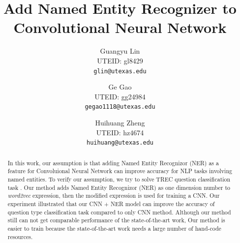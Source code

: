 \documentclass[10pt,twocolumn,letterpaper]{article}
\begin{document}
\title{Add Named Entity Recognizer to Convolutional Neural Network }

\author{
Guangyu Lin\\
UTEID: gl8429\\
{\tt\small glin@utexas.edu} \\
\and
Ge Gao\\
UTEID: gg24984\\
{\tt\small gegao1118@utexas.edu} \\
\and
Huihuang Zheng\\
UTEID: hz4674\\
{\tt\small huihuang@utexas.edu} \\
}

\maketitle


\begin{abstract}
In this work, our assumption is that adding Named Entity Recognizor (NER) \cite{nadeau2007survey} as a feature for Convoluional Neural Network can improve accuracy for NLP tasks involving named entities. To verify our assumption, we try to solve TREC question classification task \cite{li2002learning}. Our method adds Named Entity Recognizor (NER) as one dimension number to \textit{word2vec} expression, then the modified expression is used for training a CNN. Our experiment illustrated that our CNN + NER model can improve the accuracy of question type classification task compared to only CNN method. Although our method still can not get comparable performance of the state-of-the-art work, Our method is easier to train because the state-of-the-art work needs a large number of hand-code resources. 
\end{abstract}

\end{document}
